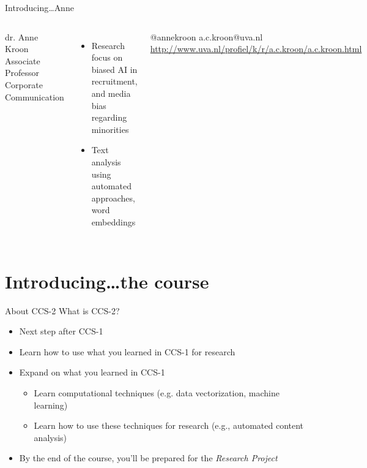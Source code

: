 \documentclass[handout]{beamer}
\begin{document}
\begin{frame}{Introducing\ldots \huge{Anne}} 
	\begin{columns}[]    dr. Anne Kroon \\ 
		Associate Professor Corporate Communication
		\begin{itemize} 
			\item Research focus on biased AI in recruitment, and media bias regarding minorities
			\item Text analysis using automated approaches, word embeddings
		\end{itemize} @annekroon \textbar a.c.kroon@uva.nl  \textbar \\ \url{http://www.uva.nl/profiel/k/r/a.c.kroon/a.c.kroon.html} 
	\end{columns} 
\end{frame}

\section[The course]{Introducing\ldots the course}

\begin{frame}{About CCS-2} 
What is CCS-2?
	\begin{itemize}
		\item Next step after CCS-1 
		\item Learn how to use what you learned in CCS-1 for research
		\item Expand on what you learned in CCS-1
		\begin{itemize}
			\item Learn computational techniques (e.g. data vectorization, machine learning)
			\item Learn how to use these techniques for research (e.g., automated content analysis)
		\end{itemize}
		\item By the end of the course, you'll be prepared for the \emph{Research Project}
	\end{itemize}
	
\end{frame}
\end{document}
